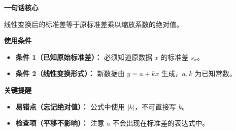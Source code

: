 \begin{summarybox}
	\textbf{\textcolor{CSummary}{一句话核心}}

	线性变换后的标准差等于原标准差乘以缩放系数的绝对值。

	\medskip
	\textbf{\textcolor{CSummary}{使用条件}}
	\begin{itemize}[leftmargin=*, itemsep=0.5em, topsep=0.4em]
		\item \textbf{条件 1（已知原始标准差）：} 必须知道原数据 $x$ 的标准差 $s_x$。
		\item \textbf{条件 2（线性变换形式）：} 新数据由 $y = a + kx$ 生成，$a, k$ 为已知常数。
	\end{itemize}

	\medskip
	\textbf{\textcolor{CSummary}{关键提醒}}
	\begin{itemize}[leftmargin=*, itemsep=0.5em, topsep=0.4em]
		\item \textbf{易错点（忘记绝对值）：} 公式中使用 $|k|$，不可直接写 $k$。
		\item \textbf{检查项（平移不影响）：} 注意 $a$ 不会出现在标准差的表达式中。
	\end{itemize}
\end{summarybox}
